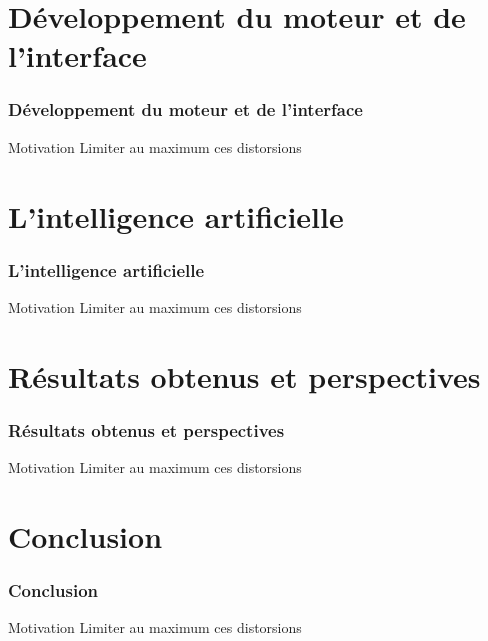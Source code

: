 \documentclass{beamer}
\begin{document}
	\section{Développement du moteur et de l'interface}
	\begin{frame}
		\frametitle{Développement du moteur et de l'interface}
		\begin{block}{Motivation}
			Limiter au maximum ces distorsions
		\end{block}	
	\end{frame}
	
	\section{L'intelligence artificielle}
	\begin{frame}
		\frametitle{L'intelligence artificielle}
		\begin{block}{Motivation}
			Limiter au maximum ces distorsions
		\end{block}	
	\end{frame}
	
	\section{Résultats obtenus et perspectives}
	\begin{frame}
		\frametitle{Résultats obtenus et perspectives}
		\begin{block}{Motivation}
			Limiter au maximum ces distorsions
		\end{block}	
	\end{frame}
	
	\section{Conclusion}
	\begin{frame}
		\frametitle{Conclusion}
		\begin{block}{Motivation}
			Limiter au maximum ces distorsions
		\end{block}	
	\end{frame}
	
\end{document}
